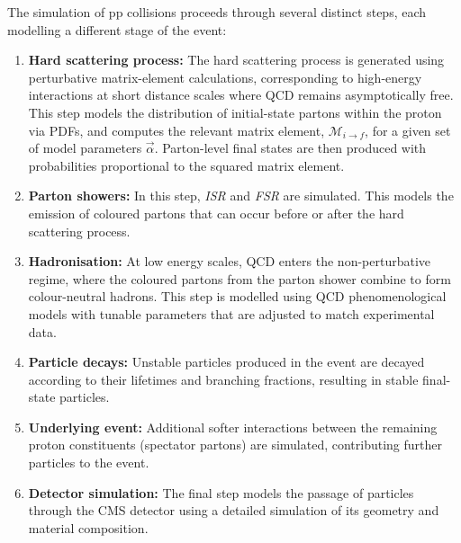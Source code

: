 The simulation of pp collisions proceeds through several distinct steps, each modelling a different stage of the event:

\begin{enumerate}
    \item \textbf{Hard scattering process:} The hard scattering process is generated using perturbative matrix-element calculations, corresponding to high-energy interactions at short distance scales where QCD remains asymptotically free. This step models the distribution of initial-state partons within the proton via \acp{PDF}, and computes the relevant matrix element, $\mathcal{M}_{i \to f}$, for a given set of model parameters $\vec{\alpha}$. Parton-level final states are then produced with probabilities proportional to the squared matrix element.

    \item \textbf{Parton showers:} In this step, \textit{\ac{ISR}} and \textit{\ac{FSR}} are simulated. This models the emission of coloured partons that can occur before or after the hard scattering process.

    \item \textbf{Hadronisation:} At low energy scales, QCD enters the non-perturbative regime, where the coloured partons from the parton shower combine to form colour-neutral hadrons. This step is modelled using QCD phenomenological models with tunable parameters that are adjusted to match experimental data.

    \item \textbf{Particle decays:} Unstable particles produced in the event are decayed according to their lifetimes and branching fractions, resulting in stable final-state particles.

    \item \textbf{Underlying event:} Additional softer interactions between the remaining proton constituents (spectator partons) are simulated, contributing further particles to the event.

    \item \textbf{Detector simulation:} The final step models the passage of particles through the CMS detector using a detailed simulation of its geometry and material composition.
\end{enumerate}


